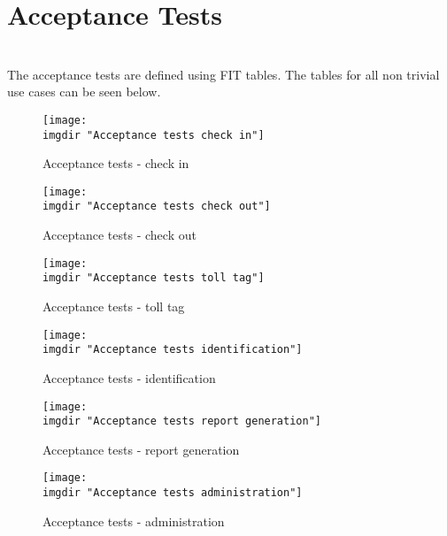 \chapter{Acceptance Tests}
\pawel \martin \\
The acceptance tests are defined using FIT tables. The tables for all non trivial use cases can be seen below.

\begin{figure}[H]
\texttt{[image: \\imgdir "Acceptance tests check in"]}
\centering
\caption{Acceptance tests - check in}
\label{fig:acceptance_tests_check_in}
\end{figure}

\begin{figure}[H]
\texttt{[image: \\imgdir "Acceptance tests check out"]}
\centering
\caption{Acceptance tests - check out}
\label{fig:acceptance_tests_check_out}
\end{figure}

\begin{figure}[H]
\texttt{[image: \\imgdir "Acceptance tests toll tag"]}
\centering
\caption{Acceptance tests - toll tag}
\label{fig:acceptance_tests_toll_tag}
\end{figure}

\begin{figure}[H]
\texttt{[image: \\imgdir "Acceptance tests identification"]}
\centering
\caption{Acceptance tests - identification}
\label{fig:acceptance_tests_identification}
\end{figure}

\begin{figure}[H]
\texttt{[image: \\imgdir "Acceptance tests report generation"]}
\centering
\caption{Acceptance tests - report generation}
\label{fig:acceptance_tests_report_generation}
\end{figure}

\begin{figure}[H]
\texttt{[image: \\imgdir "Acceptance tests administration"]}
\centering
\caption{Acceptance tests - administration}
\label{fig:acceptance_tests_administration}
\end{figure}